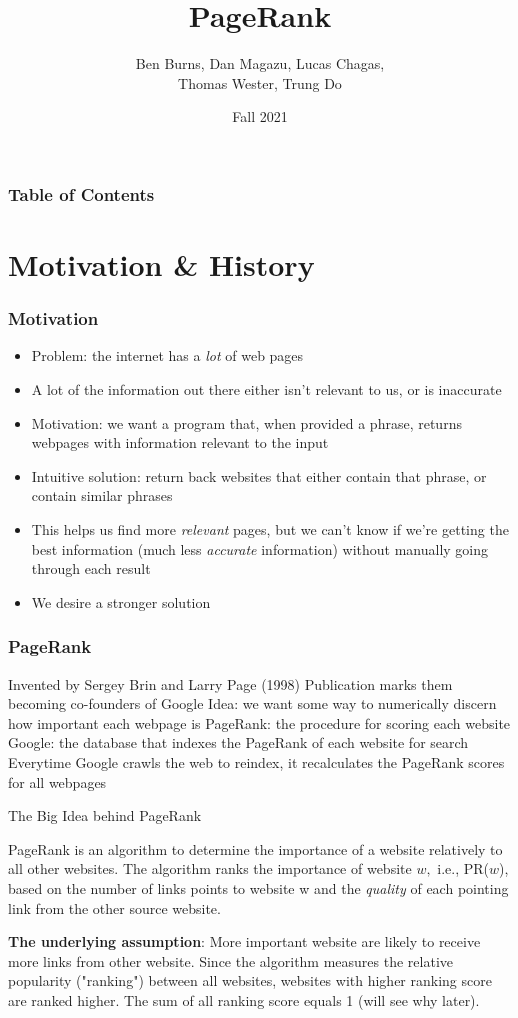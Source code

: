 \documentclass{beamer}
\title{PageRank}
\author{Ben Burns, Dan Magazu, Lucas Chagas, \\Thomas Wester, Trung Do}
\date{Fall 2021}
\begin{document}
\frame{\titlepage}

\begin{frame}
\frametitle{Table of Contents}
\tableofcontents
\end{frame}


\section{Motivation \& History}
\begin{frame}[t]
\frametitle{Motivation}
\begin{itemize}
    \setlength\itemsep{0.5em}
    \item Problem: the internet has a \emph{lot} of web pages
    \item A lot of the information out there either isn't relevant to us, or is inaccurate
    \item Motivation: we want a program that, when provided a phrase, returns webpages with information relevant to the input
    \item Intuitive solution: return back websites that either contain that phrase, or contain similar phrases
    \item This helps us find more \emph{relevant} pages, but we can't know if we're getting the best information (much less \emph{accurate} information) without manually going through each result
    \item We desire a stronger solution
\end{itemize}
\end{frame}

\begin{frame}[t]
\frametitle{PageRank}
\begin{outline}
    \1 Invented by Sergey Brin and Larry Page (1998)\footnotemark 
        \2 Publication marks them becoming co-founders of Google  
    \1 Idea: we want some way to numerically discern how important each webpage is
    \1 PageRank: the procedure for scoring each website
    \1 Google: the database that indexes the PageRank of each website for search
    \1 Everytime Google crawls the web to reindex, it recalculates the PageRank scores for all webpages
\end{outline}
\end{frame}

\begin{frame}[t]{The Big Idea behind PageRank}
\begin{outline}
    \1 PageRank is an algorithm to determine the importance of a website relatively to all other websites. The algorithm ranks the importance of website $w,$ i.e., PR($w$), based on the number of links points to website w and the \emph{quality} of each pointing link from the other source website. 

    \1 \textbf{The underlying assumption}: More important website are likely to receive more links from other website. Since the algorithm measures the relative popularity ("ranking") between all websites, websites with higher ranking score are ranked higher. The sum of all ranking score equals 1 (will see why later).
\end{outline}
\end{frame}
\end{document}
